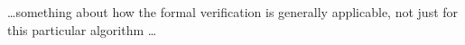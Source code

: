 \documentclass[acmlarge,review,anonymous]{acmart}\settopmatter{printfolios=true}
\begin{document}
\dots something about how the formal verification is generally applicable, not just for this
particular algorithm \dots

%
%
%

\end{document}
